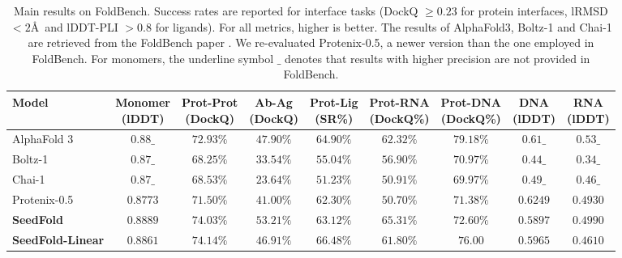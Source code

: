 \documentclass[]{bytedance_seed}
\newcommand{\todoq}[2][]{\todo[size=\scriptsize,color=orange!20!white,#1]{Quanquan: #2}}
\begin{document}
\begin{table}[t]
    \centering
    \caption{Main results on FoldBench. Success rates are reported for interface tasks (DockQ $\geq 0.23$ for protein interfaces,  lRMSD $< 2$\AA~and lDDT-PLI $> 0.8$ for ligands). For all metrics, higher is better. The results of AlphaFold3, Boltz-1 and Chai-1 are retrieved from the FoldBench paper \cite{xu2025benchmarking}. We re-evaluated Protenix-0.5, a newer version than the one employed in FoldBench. For monomers, the underline symbol $\_$ denotes that results with higher precision are not provided in FoldBench.}
    \label{tab:main_results}
    \begin{tabular}{lcccccccc}
        \toprule
        \textbf{Model} & \makecell{\textbf{Monomer}\\\textbf{(lDDT)}} & \makecell{\textbf{Prot-Prot}\\\textbf{(DockQ)}} & \makecell{\textbf{Ab-Ag}\\\textbf{(DockQ)}} & \makecell{\textbf{Prot-Lig}\\\textbf{(SR\%)}} &
        \makecell{\textbf{Prot-RNA}\\\textbf{(DockQ\%)}} &
        \makecell{\textbf{Prot-DNA}\\\textbf{(DockQ\%)}} &
        \makecell{\textbf{DNA}\\\textbf{(lDDT)}} &
        \makecell{\textbf{RNA}\\\textbf{(lDDT)}}
        \\
        \midrule
        AlphaFold 3 & $0.88\_$ & $72.93\%$ & $47.90\%$ & $64.90\%$ & $62.32\%$ & $\mathbf{79.18\%}$ & $0.61\_$ & $\mathbf{0.53\_}$ \\
        Boltz-1 & $0.87\_$ & $68.25\%$ & $33.54\%$ & $55.04\%$ & $56.90\%$ & $70.97\%$ & $0.44\_$ & $0.34\_$ \\
        Chai-1 & $0.87\_$ & $68.53\%$ & $23.64\%$ & $51.23\%$ & $50.91\%$ & $69.97\%$ & $0.49\_$ & $0.46\_$\\
        Protenix-0.5 & $0.8773$ & $71.50\%$ & $41.00\%$ & $62.30\%$ & $50.70\%$ & $71.38\%$ & $\mathbf{0.6249}$ & $0.4930$\\
        \midrule
        \textbf{SeedFold} & $\mathbf{0.8889}$ & $74.03\%$ & $\mathbf{53.21}\%$ & $63.12\%$ & $\mathbf{65.31}\%$ & $72.60\%$ & $0.5897$ & $0.4990$ \\
        \textbf{SeedFold-Linear} & $0.8861$ & $\mathbf{74.14\%}$ & $46.91\%$ & $\mathbf{66.48\%}$ & $61.80\%$ & $76.00$ & $0.5965$ & $0.4610$ \\
        \bottomrule
    \end{tabular}
\end{table}
\end{document}
